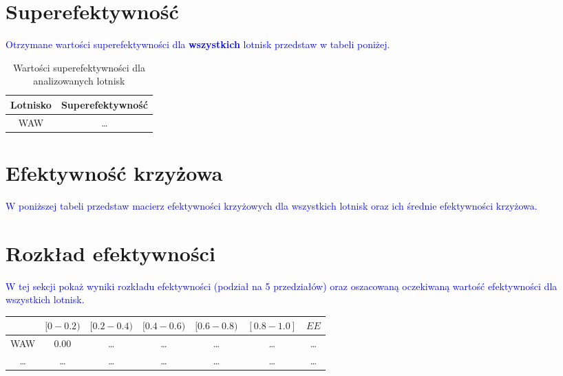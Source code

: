 \documentclass[a4paper,12pt]{article}
\begin{document}
\section{Superefektywność}

\textcolor{blue}{Otrzymane wartości superefektywności dla \textbf{wszystkich} lotnisk przedstaw w tabeli poniżej.}

\begin{table}[H]
    \centering
    \begin{tabular}{c|c}
    \hline
         Lotnisko & Superefektywność  \\ \hline
         WAW & \ldots \\
         \hline
    \end{tabular}
    \caption{Wartości superefektywności dla analizowanych lotnisk}
    \label{tab:airports-super-efficiency}
\end{table}

\section{Efektywność krzyżowa}

\textcolor{blue}{W poniższej tabeli przedstaw macierz efektywności krzyżowych dla wszystkich lotnisk oraz ich średnie efektywności krzyżowa.}    

\begin{table}[H]
\label{tab:airports-cross-efficiency}
\end{table}
            
\section{Rozkład efektywności}
\textcolor{blue}{W tej sekcji pokaż wyniki rozkładu efektywności (podział na 5 przedziałów) oraz oszacowaną oczekiwaną wartość efektywności dla wszystkich lotnisk.}
\begin{table}[H]
\begin{tabular}{c|ccccc|c}
\hline
    & $[0-0.2)$ & $[0.2-0.4)$ & $[0.4-0.6)$ & $[0.6-0.8)$ & $[0.8-1.0]$ & $EE$    \\ \hline
WAW & 0.00      & \ldots & \ldots & \ldots & \ldots & \ldots \\
\ldots & \ldots & \ldots & \ldots & \ldots & \ldots & \ldots \\
\hline
\end{tabular}
\label{tab:efficiency-distribution}
\end{table}
\end{document}
